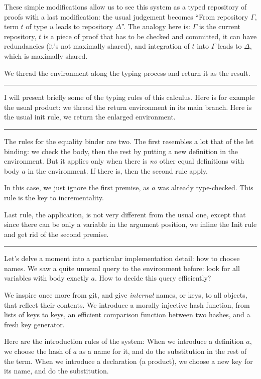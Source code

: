 \documentclass[12pt]{article}
\newcommand{\slide}{\vspace{1em} \hrule \vspace{1em}}
\begin{document}
These simple modifications allow us to see this system as a typed
repository of proofs with a last modification: the usual judgement
becomes ``From repository $\Gamma$, term $t$ of type $u$ leads to
repository $\Delta$''. The analogy here is: $\Gamma$ is the current
repository, $t$ is a piece of proof that has to be checked and
committed, it can have redundancies (it's not maximally shared), and
integration of $t$ into $\Gamma$ leads to $\Delta$, which is maximally
shared.

We thread the environment along the typing process and return it as
the result.

\slide

I will present briefly some of the typing rules of this calculus. Here
is for example the usual product: we thread the return environment in
its main branch. Here is the usual init rule, we return the enlarged
environment.

\slide

The rules for the equality binder are two. The first resembles a lot
that of the \textsf{let} binding: we check the body, then the rest by
putting a new definition in the environment. But it applies only when
there is \emph{no} other equal definitions with body $a$ in the
environment. If there is, then the second rule apply.

In this case, we just ignore the first premise, as $a$ was already
type-checked. This rule is the key to incrementality.

Last rule, the application, is not very different from the usual one,
except that since there can be only a variable in the argument
position, we inline the Init rule and get rid of the second premise.

\slide

Let's delve a moment into a particular implementation detail: how to
choose names. We saw a quite unusual query to the environment before:
look for all variables with body exactly $a$. How to decide this query
efficiently?

We inspire once more from \textsf{git}, and give \emph{internal}
names, or keys, to all objects, that reflect their contents. We
introduce a morally injective hash function, from lists of keys to
keys, an efficient comparison function between two hashes, and a fresh
key generator.

Here are the introduction rules of the system: When we introduce a
definition $a$, we choose the hash of $a$ as a name for it, and do the
substitution in the rest of the term. When we introduce a declaration
(a product), we choose a new key for its name, and do the
substitution.
\end{document}
